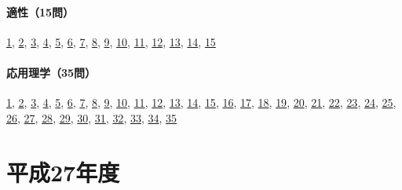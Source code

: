 \paragraph{適性（15問）} \hyperref[q:h26-reg-apt-01]{1}, \hyperref[q:h26-reg-apt-02]{2}, \hyperref[q:h26-reg-apt-03]{3}, \hyperref[q:h26-reg-apt-04]{4}, \hyperref[q:h26-reg-apt-05]{5}, \hyperref[q:h26-reg-apt-06]{6}, \hyperref[q:h26-reg-apt-07]{7}, \hyperref[q:h26-reg-apt-08]{8}, \hyperref[q:h26-reg-apt-09]{9}, \hyperref[q:h26-reg-apt-10]{10}, \hyperref[q:h26-reg-apt-11]{11}, \hyperref[q:h26-reg-apt-12]{12}, \hyperref[q:h26-reg-apt-13]{13}, \hyperref[q:h26-reg-apt-14]{14}, \hyperref[q:h26-reg-apt-15]{15}
\paragraph{応用理学（35問）} \hyperref[q:h26-reg-applied-01]{1}, \hyperref[q:h26-reg-applied-02]{2}, \hyperref[q:h26-reg-applied-03]{3}, \hyperref[q:h26-reg-applied-04]{4}, \hyperref[q:h26-reg-applied-05]{5}, \hyperref[q:h26-reg-applied-06]{6}, \hyperref[q:h26-reg-applied-07]{7}, \hyperref[q:h26-reg-applied-08]{8}, \hyperref[q:h26-reg-applied-09]{9}, \hyperref[q:h26-reg-applied-10]{10}, \hyperref[q:h26-reg-applied-11]{11}, \hyperref[q:h26-reg-applied-12]{12}, \hyperref[q:h26-reg-applied-13]{13}, \hyperref[q:h26-reg-applied-14]{14}, \hyperref[q:h26-reg-applied-15]{15}, \hyperref[q:h26-reg-applied-16]{16}, \hyperref[q:h26-reg-applied-17]{17}, \hyperref[q:h26-reg-applied-18]{18}, \hyperref[q:h26-reg-applied-19]{19}, \hyperref[q:h26-reg-applied-20]{20}, \hyperref[q:h26-reg-applied-21]{21}, \hyperref[q:h26-reg-applied-22]{22}, \hyperref[q:h26-reg-applied-23]{23}, \hyperref[q:h26-reg-applied-24]{24}, \hyperref[q:h26-reg-applied-25]{25}, \hyperref[q:h26-reg-applied-26]{26}, \hyperref[q:h26-reg-applied-27]{27}, \hyperref[q:h26-reg-applied-28]{28}, \hyperref[q:h26-reg-applied-29]{29}, \hyperref[q:h26-reg-applied-30]{30}, \hyperref[q:h26-reg-applied-31]{31}, \hyperref[q:h26-reg-applied-32]{32}, \hyperref[q:h26-reg-applied-33]{33}, \hyperref[q:h26-reg-applied-34]{34}, \hyperref[q:h26-reg-applied-35]{35}
\section{平成27年度}
